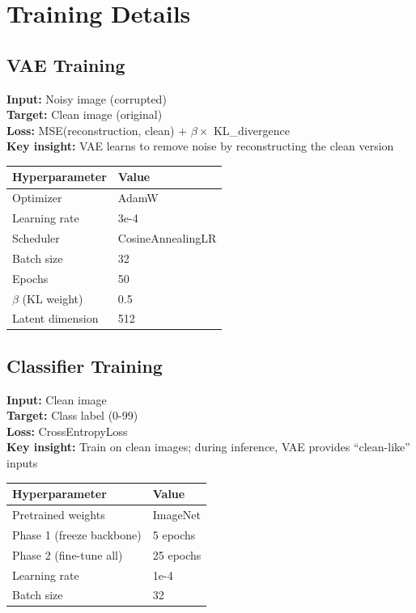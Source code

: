 \documentclass[11pt,a4paper]{article}
\begin{document}
\section{Training Details}

\subsection{VAE Training}

\begin{taskbox}
\textbf{Input:} Noisy image (corrupted)\\
\textbf{Target:} Clean image (original)\\
\textbf{Loss:} MSE(reconstruction, clean) + $\beta \times$ KL\_divergence\\
\textbf{Key insight:} VAE learns to remove noise by reconstructing the clean version
\end{taskbox}

\begin{center}
\begin{tabular}{@{}ll@{}}
\toprule
\textbf{Hyperparameter} & \textbf{Value} \\
\midrule
Optimizer & AdamW \\
Learning rate & 3e-4 \\
Scheduler & CosineAnnealingLR \\
Batch size & 32 \\
Epochs & 50 \\
$\beta$ (KL weight) & 0.5 \\
Latent dimension & 512 \\
\bottomrule
\end{tabular}
\end{center}

\subsection{Classifier Training}

\begin{taskbox}
\textbf{Input:} Clean image\\
\textbf{Target:} Class label (0-99)\\
\textbf{Loss:} CrossEntropyLoss\\
\textbf{Key insight:} Train on clean images; during inference, VAE provides ``clean-like'' inputs
\end{taskbox}

\begin{center}
\begin{tabular}{@{}ll@{}}
\toprule
\textbf{Hyperparameter} & \textbf{Value} \\
\midrule
Pretrained weights & ImageNet \\
Phase 1 (freeze backbone) & 5 epochs \\
Phase 2 (fine-tune all) & 25 epochs \\
Learning rate & 1e-4 \\
Batch size & 32 \\
\bottomrule
\end{tabular}
\end{center}
\end{document}
